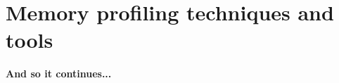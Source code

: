 \chapter{Memory profiling techniques and tools}
\label{chapter:instrmet}

\textbf{And so it continues...}\\

